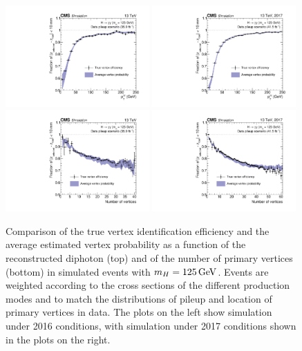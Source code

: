 \begin{figure}[h!]
  \centering
  \includegraphics[width=0.49\textwidth]{Figures/Objects/VtxProbPt2016}
  \includegraphics[width=0.49\textwidth]{Figures/Objects/VtxProbPt2017} \\
  \includegraphics[width=0.49\textwidth]{Figures/Objects/VtxProbNvtx2016}
  \includegraphics[width=0.49\textwidth]{Figures/Objects/VtxProbNvtx2017}
  \caption[Vertex probability validation in simulated \Hgg events.]
  {
    Comparison of the true vertex identification efficiency and the average estimated
    vertex probability as a function of the reconstructed diphoton \pt (top) and of the number of
    primary vertices (bottom) in simulated \Hgg events with $m_{H} = \SI{125}{GeV}$. Events are weighted
    according to the cross sections of the different production modes and to match the distributions
    of pileup and location of primary vertices in data.
    The plots on the left show simulation under 2016 conditions, 
    with simulation under 2017 conditions shown in the plots on the right.
  }
  \label{fig:obj_VtxProb}
\end{figure}

